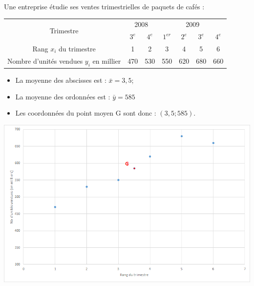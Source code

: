 
\begin{myex}
	Une entreprise étudie ses ventes trimestrielles de paquets de cafés :\\
	
		

	\begin{center}
			{\footnotesize  \begin{tabular}{|@{\ }c@{\ }|@{\ }c@{\ }|@{\ }c@{\ }|@{\ }c@{\ }|@{\ }c@{\ }|@{\ }c@{\ }|@{\ }c@{\ }|}
			\hline
			\multirow{2}{*}{Trimestre}               & \multicolumn{2}{c|}{2008} & \multicolumn{4}{c|}{2009}      \\ \cline{2-7} 
			& $3^e$       & $4^e$       & $1^{er}$ & $2^e$ & $3^e$ & $4^e$ \\ \hline
			Rang $x_i$ du trimestre                  & 1           & 2           & 3      & 4     & 5     & 6     \\ \hline
			Nombre d'unités vendues $y_i$ en millier & 470         & 530         & 550    & 620   & 680   & 660   \\ \hline
		\end{tabular}}
	\end{center}
	
	\vspace*{5mm}
	
	\begin{multicols}{2}
			\begin{itemize}
				\item La moyenne des abscisses est : $\bar{x} = 3,5$;
				\item La moyenne des ordonnées est : $\bar{y} = 585$
				\item Les coordonnées du point moyen G sont donc : $(3,5 ; 585)$.\\
			\end{itemize}
			
			\includegraphics[scale=0.5]{./img/graph}
	\end{multicols}

\end{myex}